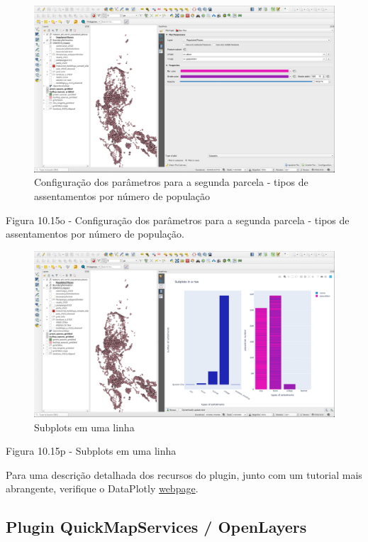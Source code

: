 \documentclass[
]{krantz}
\begin{document}
\begin{figure}
\centering
\includegraphics{media/modulo10/fig1015_o.png}
\caption{Configuração dos parâmetros para a segunda parcela - tipos de assentamentos por número de população}
\end{figure}

Figura 10.15o - Configuração dos parâmetros para a segunda parcela - tipos de assentamentos por número de população.

\begin{figure}
\centering
\includegraphics{media/modulo10/fig1015_p.png}
\caption{Subplots em uma linha}
\end{figure}

Figura 10.15p - Subplots em uma linha

Para uma descrição detalhada dos recursos do plugin, junto com um tutorial mais abrangente, verifique o DataPlotly \href{https:\%20//\%20github\%20.com\%20/\%20ghtmtt\%20/\%20DataPlotly}{webpage}.

\hypertarget{plugin-quickmapservices-openlayers}{%
\subsection{Plugin QuickMapServices / OpenLayers}\label{plugin-quickmapservices-openlayers}}
\end{document}
